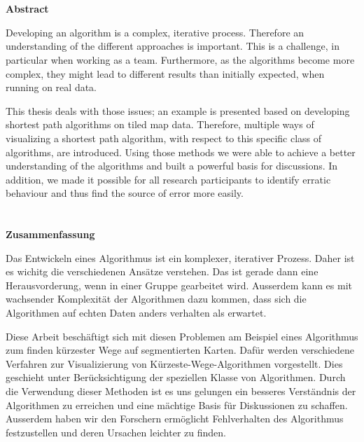 \chapter*{}
\thispagestyle{empty}

\begin{center}
    \large \textbf{Abstract}
\end{center}

Developing an algorithm is a complex, iterative process.
Therefore an understanding of the different approaches is important.
This is a challenge, in particular when working as a team.
Furthermore, as the algorithms become more complex, they might lead to different results than initially expected, when running on real data.

This thesis deals with those issues; an example is presented based on developing shortest path algorithms on tiled map data.
Therefore, multiple ways of visualizing a shortest path algorithm, with respect to this specific class of algorithms, are introduced.
Using those methods we were able to achieve a better understanding of the algorithms and built a powerful basis for discussions.
In addition, we made it possible for all research participants to identify erratic behaviour and thus find the source of error more easily.

\chapter*{}
\thispagestyle{empty}

\begin{center}
    \large \textbf{Zusammenfassung}
\end{center}

Das Entwickeln eines Algorithmus ist ein komplexer, iterativer Prozess.
Daher ist es wichitg die verschiedenen Ansätze verstehen.
Das ist gerade dann eine Herausvorderung, wenn in einer Gruppe gearbeitet wird.
Ausserdem kann es mit wachsender Komplexität der Algorithmen dazu kommen, dass sich die Algorithmen auf echten Daten anders verhalten als erwartet.

Diese Arbeit beschäftigt sich mit diesen Problemen am Beispiel eines Algorithmus zum finden kürzester Wege auf segmentierten Karten.
Dafür werden verschiedene Verfahren zur Visualizierung von Kürzeste-Wege-Algorithmen vorgestellt.
Dies geschieht unter Berücksichtigung der speziellen Klasse von Algorithmen.
Durch die Verwendung dieser Methoden ist es uns gelungen ein besseres Verständnis der Algorithmen zu erreichen und eine mächtige Basis für Diskussionen zu schaffen.
Ausserdem haben wir den Forschern ermöglicht Fehlverhalten des Algorithmus festzustellen und deren Ursachen leichter zu finden.
